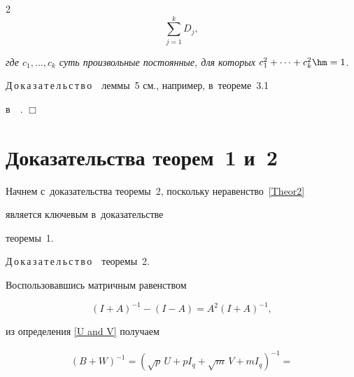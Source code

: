 \begin{multicols}{2}
\begin{equation*}
\sum\limits_{j=1}^{k} D_j,


  \end{equation*}


\textit{где $c_1,\dots , c_k $ суть произвольные постоянные, для которых}   $c_1^2 + 


\dots + c_k^2 \hm= 1$.





\noindent


Д\,о\,к\,а\,з\,а\,т\,е\,л\,ь\,с\,т\,в\,о\ \ леммы~5 см., например, в~теореме~3.1 


в~~\cite{lit:Letters_2006}. \hfill $\Box$











\section{Доказательства теорем~1 и~2}


\label{sec:proofs}








Начнем с~доказательства теоремы~2, поскольку неравенство~\eqref{Theor2} 


является ключевым в~доказательстве 


теоремы~1.





\noindent


Д\,о\,к\,а\,з\,а\,т\,е\,л\,ь\,с\,т\,в\,о\ \ теоремы~2.


Воспользовавшись матричным равенством


\begin{equation*}




\left(I+A\right)^{-1}-\left(I-A\right)=A^{2}\left(I+A\right)^{-1},


\end{equation*}


из определения \eqref{U and V} получаем


\begin{multline*}


\left(B+W\right)^{-1}=\left(\sqrt{p}\,U+pI_{q}+\sqrt{m}\,V+mI_{q}\right)^{-1}={}\\



\end{multline*}
\end{multicols}
